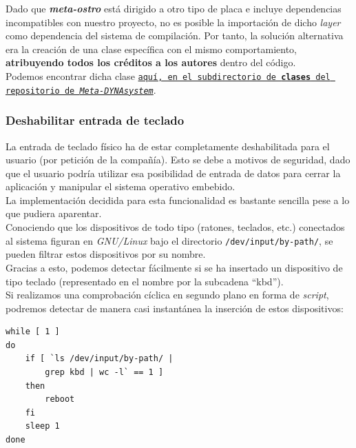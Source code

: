 Dado que \textbf{\textit{meta-ostro}} está dirigido a otro tipo de placa e incluye dependencias incompatibles con nuestro proyecto, no es posible la importación de dicho \textit{layer} como dependencia del sistema de compilación. Por tanto, la solución alternativa era la creación de una clase específica con el mismo comportamiento, \textbf{atribuyendo todos los créditos a los autores} dentro del código.\\

Podemos encontrar dicha clase \href{https://github.com/adrianmorente/meta-dynasystem/blob/master/classes/dynasystem-image.bbclass}{\texttt{aquí, en el subdirectorio de \textbf{clases} del repositorio de \textit{Meta-DYNAsystem}}}.

\subsubsection{Deshabilitar entrada de teclado}

La entrada de teclado físico ha de estar completamente deshabilitada para el usuario (por petición de la compañía). Esto se debe a motivos de seguridad, dado que el usuario podría utilizar esa posibilidad de entrada de datos para cerrar la aplicación y manipular el sistema operativo embebido.\\

La implementación decidida para esta funcionalidad es bastante sencilla pese a lo que pudiera aparentar.\\

Conociendo que los dispositivos de todo tipo (ratones, teclados, etc.) conectados al sistema figuran en \textit{GNU/Linux} bajo el directorio \texttt{/dev/input/by-path/}, se pueden filtrar estos dispositivos por su nombre.\\

Gracias a esto, podemos detectar fácilmente si se ha insertado un dispositivo de tipo teclado (representado en el nombre por la subcadena ``kbd'').\\

Si realizamos una comprobación cíclica en segundo plano en forma de \textit{script}, podremos detectar de manera casi instantánea la inserción de estos dispositivos:\\

\begin{lstlisting}
while [ 1 ]
do
	if [ `ls /dev/input/by-path/ | 
		grep kbd | wc -l` == 1 ]
	then
		reboot
	fi
	sleep 1
done
\end{lstlisting}


